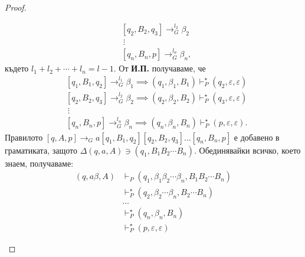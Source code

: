 \begin{proof}
\begin{description}
\begin{align*}
      & [q_2,B_2,q_{3}] \to^{l_2}_G \beta_2\\
      & \ \vdots\\
      & [q_{n},B_n, p] \rightarrow^{l_n}_G \beta_n,
    \end{align*}
    където $l_1 + l_2 + \cdots + l_n = l-1$.
    От {\bf И.П.} получаваме, че 
    \begin{align*}
      & [q_1,B_1,q_{2}] \to^{l_1}_G \beta_1 \implies (q_1,\beta_1,B_1) \vdash^\star_P (q_{2},\varepsilon,\varepsilon) \\
      & [q_2,B_2,q_{3}] \to^{l_2}_G \beta_2 \implies (q_2,\beta_2,B_2) \vdash^\star_P (q_{3},\varepsilon,\varepsilon)\\
      & \ \vdots\\
      & [q_{n},B_n, p] \rightarrow^{l_n}_G \beta_n \implies  (q_{n},\beta_n,B_n) \vdash^\star_P (p,\varepsilon,\varepsilon).
    \end{align*}
    Правилото $[q,A,p] \rightarrow_G a[q_1,B_1,q_2][q_2,B_2,q_3]\dots[q_n,B_n,p]$ е добавено в граматиката, 
    защото $\Delta(q,a,A) \ni (q_1, B_1B_2\cdots B_n)$. 
    Обединявайки всичко, което знаем, получаваме:
    \begin{align*}
      (q, a\beta, A) & \vdash_P (q_1, \beta_1\beta_2\cdots\beta_n, B_1B_2\cdots B_n)\\
                     & \vdash^\star_P (q_2, \beta_{2}\cdots\beta_n, B_2\cdots B_n)\\
                     & \dots\\
                     & \vdash^\star_P (q_n, \beta_n, B_n)\\
                     & \vdash^\star_P (p, \varepsilon, \varepsilon)
    \end{align*}
  \end{description}
\end{proof}
  
